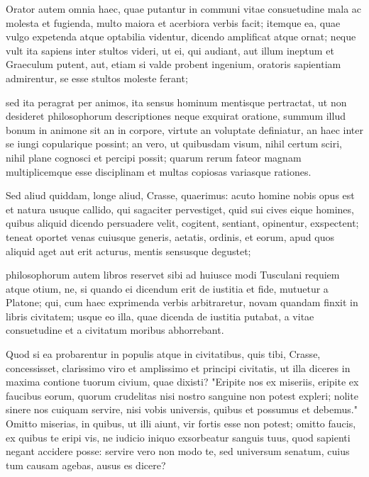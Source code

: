  Orator autem omnia haec, quae putantur in communi vitae consuetudine mala ac molesta et fugienda, multo maiora et acerbiora verbis facit; itemque ea, quae vulgo expetenda atque optabilia videntur, dicendo amplificat atque ornat; neque vult ita sapiens inter stultos videri, ut ei, qui audiant, aut illum ineptum et Graeculum putent, aut, etiam si valde probent ingenium, oratoris sapientiam admirentur, se esse stultos moleste ferant;

 sed ita peragrat per animos, ita sensus hominum mentisque pertractat, ut non desideret philosophorum descriptiones neque exquirat oratione, summum illud bonum in animone sit an in corpore, virtute an voluptate definiatur, an haec inter se iungi copularique possint; an vero, ut quibusdam visum, nihil certum sciri, nihil plane cognosci et percipi possit; quarum rerum fateor magnam multiplicemque esse disciplinam et multas copiosas variasque rationes.

 Sed aliud quiddam, longe aliud, Crasse, quaerimus: acuto homine nobis opus est et natura usuque callido, qui sagaciter pervestiget, quid sui cives eique homines, quibus aliquid dicendo persuadere velit, cogitent, sentiant, opinentur, exspectent; teneat oportet venas cuiusque generis, aetatis, ordinis, et eorum, apud quos aliquid aget aut erit acturus, mentis sensusque degustet;

 philosophorum autem libros reservet sibi ad huiusce modi Tusculani requiem atque otium, ne, si quando ei dicendum erit de iustitia et fide, mutuetur a Platone; qui, cum haec exprimenda verbis arbitraretur, novam quandam finxit in libris civitatem; usque eo illa, quae dicenda de iustitia putabat, a vitae consuetudine et a civitatum moribus abhorrebant.

 Quod si ea probarentur in populis atque in civitatibus, quis tibi, Crasse, concessisset, clarissimo viro et amplissimo et principi civitatis, ut illa diceres in maxima contione tuorum civium, quae dixisti? "Eripite nos ex miseriis, eripite ex faucibus eorum, quorum crudelitas nisi nostro sanguine non potest expleri; nolite sinere nos cuiquam servire, nisi vobis universis, quibus et possumus et debemus." Omitto miserias, in quibus, ut illi aiunt, vir fortis esse non potest; omitto faucis, ex quibus te eripi vis, ne iudicio iniquo exsorbeatur sanguis tuus, quod sapienti negant accidere posse: servire vero non modo te, sed universum senatum, cuius tum causam agebas, ausus es dicere?

